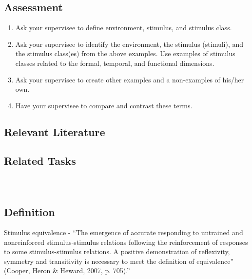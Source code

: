 \subsection{Assessment}
\begin{enumerate}
\item Ask your supervisee to define environment, stimulus, and stimulus class.   
\item Ask your supervisee to identify the environment, the stimulus (stimuli), and the stimulus class(es) from the above examples.  Use examples of stimulus classes related to the formal, temporal, and functional dimensions. 
\item Ask your supervisee to create other examples and a non-examples of his/her own. 
\item Have your supervisee to compare and contrast these terms. 
%
\end{enumerate}
%
\subsection{Relevant Literature}
\begin{refsection}
\nocite{test,alang2017police,clayton2018black}
\printbibliography[heading=none]
\end{refsection}
%
\subsection{Related Tasks}
\fourFKEleven{}\\
%
%
%
%
%
%
\section{\fourFKTwelve{}}
\subsection{Definition}
Stimulus equivalence - ``The emergence of accurate responding to untrained and nonreinforced stimulus-stimulus relations following the reinforcement of responses to some stimulus-stimulus relations. A positive demonstration of reflexivity, symmetry and transitivity is necessary to meet the definition of equivalence'' (Cooper, Heron \& Heward, 2007, p. 705).'' 

